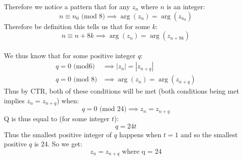 \documentclass[11pt]{article}
\begin{document}
Therefore we notice a pattern that for any $z_n$ where $n$ is an integer:
\[ n \equiv n_0 \text{ (mod 8)} \implies  \arg(z_n) = \arg(z_{n_0}) \]
Therefore be definition this tells us that for some $k$:
\[ n \equiv n + 8k \implies  \arg(z_n) = \arg(z_{n+9k})\]\\
We thus know that for some positive integer $q$:
\begin{align*}
 q = 0 \text{ (mod6)} & \implies |z_n| = |z_{n+q}|  \\
q = 0 \text{ (mod 8)} & \implies \arg(z_n) = \arg(z_{n+q})
\end{align*}
Thus by CTR, both of these conditions will be met (both conditions being met implies $z_n = z_{n+q}$) when:
\[ q = 0 \text{ (mod 24)} \implies z_n = z_{n+q} \]
Q is thus equal to (for some integer $t$):
\[ q = 24t \]
Thus the smallest positive integer of $q$ happens when $t = 1$ and so the smallest positive $q$ is 24. So we get:
\[ z_n = z_{n+q} \text{ where q = 24} \]
\end{document}
